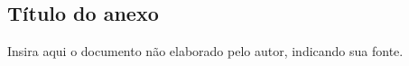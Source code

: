%
%     
\begin{anexosenv}
\partanexos

\chapter{Título do anexo}
\label{an:exemplo}

Insira aqui o documento não elaborado pelo autor, indicando sua fonte.
\end{anexosenv}
